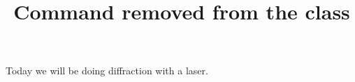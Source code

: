 \documentclass{handout}
\title{Command removed from the class}
\begin{document}
\maketitle
Today we will be doing diffraction with a laser.
\end{document}
